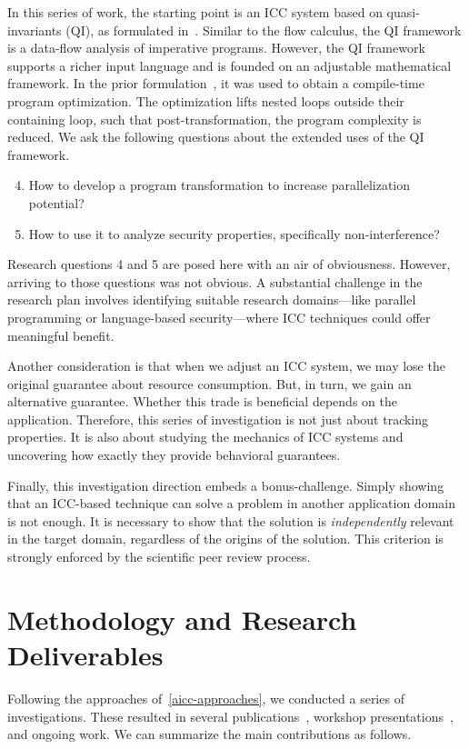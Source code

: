 In this series of work, the starting point is an ICC system based on quasi-invariants (QI), as formulated in~\cite{moyen20172}.
Similar to the flow calculus, the QI framework is a data-flow analysis of imperative programs.
However, the QI framework supports a richer input language and is founded on an adjustable mathematical framework.
In the prior formulation~\cite{moyen20172}, it was used to obtain a compile-time program optimization.
The optimization lifts nested loops outside their containing loop, such that post-transformation, the program complexity is reduced.
We ask the following questions about the extended uses of the QI framework.
\begin{enumerate}[label={(RQ\arabic*)}]
\setcounter{enumi}{3}
\item How to develop a program transformation to increase parallelization potential?
\item How to use it to analyze security properties, specifically non-interference?
\end{enumerate}
Research questions 4 and 5 are posed here with an air of obviousness.
However, arriving to those questions was not obvious.
A substantial challenge in the research plan involves identifying suitable research domains---like parallel programming or language-based security---where ICC techniques could offer meaningful benefit.

Another consideration is that when we adjust an ICC system, we may lose the original guarantee about resource consumption.
But, in turn, we gain an alternative guarantee.
Whether this trade is beneficial depends on the application.
Therefore, this series of investigation is not just about tracking properties.
It is also about studying the mechanics of ICC systems and uncovering how exactly they provide behavioral guarantees.

Finally, this investigation direction embeds a bonus-challenge.
Simply showing that an ICC-based technique can solve a problem in another application domain is not enough.
It is necessary to show that the solution is \emph{independently} relevant in the target domain, regardless of the origins of the solution.
This criterion is strongly enforced by the scientific peer review process.

\section{Methodology and Research Deliverables}
\label{aicc-methods}

Following the approaches of~\autoref{aicc-approaches}, we conducted a series of investigations.
These resulted in several publications~\cite{aubert20222,aubert20232,aubert2023b},
workshop presentations~\cite{aubert20231,aubert202217,splash22}, and ongoing work.
We can summarize the main contributions as follows.

